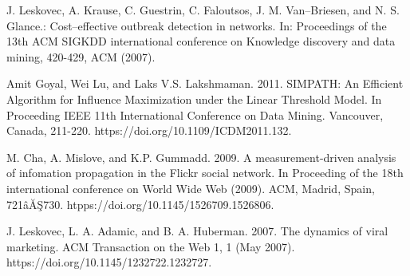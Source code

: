\begin{thebibliography}{4}
	 J. Leskovec, A. Krause, C. Guestrin, C. Faloutsos, J. M. Van–Briesen, and N. S. Glance.: Cost–effective outbreak detection in networks. In: Proceedings of the 13th ACM SIGKDD international conference on Knowledge discovery and data mining, 420-429, ACM (2007).
	
	 Amit Goyal, Wei Lu, and Laks V.S. Lakshmaman. 2011. SIMPATH: An Efficient Algorithm for Influence Maximization under the Linear Threshold Model. In Proceeding IEEE 11th International Conference on Data Mining. Vancouver, Canada, 211-220. https://doi.org/10.1109/ICDM2011.132.
	
	 M. Cha, A. Mislove, and K.P. Gummadd. 2009. A measurement-driven analysis of infomation propagation in the Flickr social network. In Proceeding of the 18th international conference on World Wide Web (2009). ACM, Madrid, Spain, 721âĂŞ730. htpps://doi.org/10.1145/1526709.1526806.
	
	 J. Leskovec, L. A. Adamic, and B. A. Huberman. 2007. The dynamics of viral marketing. ACM Transaction on the Web 1, 1 (May 2007). https://doi.org/10.1145/1232722.1232727. 
	
	
	
\end{thebibliography}
